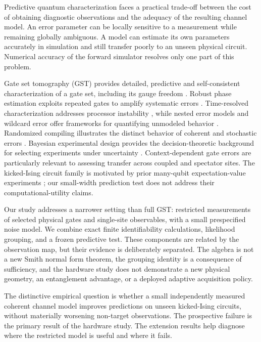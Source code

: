 \documentclass[11pt,a4paper]{article}
\begin{document}
Predictive quantum characterization faces a practical trade-off between the cost of obtaining diagnostic observations and the adequacy of the resulting channel model. An error parameter can be locally sensitive to a measurement while remaining globally ambiguous. A model can estimate its own parameters accurately in simulation and still transfer poorly to an unseen physical circuit. Numerical accuracy of the forward simulator resolves only one part of this problem.

Gate set tomography (GST) provides detailed, predictive and self-consistent characterization of a gate set, including its gauge freedom \cite{ref1,ref2}. Robust phase estimation exploits repeated gates to amplify systematic errors \cite{ref3}. Time-resolved characterization addresses processor instability \cite{ref4}, while nested error models and wildcard error offer frameworks for quantifying unmodeled behavior \cite{ref5}. Randomized compiling illustrates the distinct behavior of coherent and stochastic errors \cite{ref6}. Bayesian experimental design provides the decision-theoretic background for selecting experiments under uncertainty \cite{ref7,ref8}. Context-dependent gate errors \cite{ref10} are particularly relevant to assessing transfer across coupled and spectator sites. The kicked-Ising circuit family is motivated by prior many-qubit expectation-value experiments \cite{ref11}; our small-width prediction test does not address their computational-utility claims.

Our study addresses a narrower setting than full GST: restricted measurements of selected physical gates and single-site observables, with a small prespecified noise model. We combine exact finite identifiability calculations, likelihood grouping, and a frozen predictive test. These components are related by the observation map, but their evidence is deliberately separated. The algebra is not a new Smith normal form theorem, the grouping identity is a consequence of sufficiency, and the hardware study does not demonstrate a new physical geometry, an entanglement advantage, or a deployed adaptive acquisition policy.

The distinctive empirical question is whether a small independently measured coherent channel model improves predictions on unseen kicked-Ising circuits, without materially worsening non-target observations. The prospective failure is the primary result of the hardware study. The extension results help diagnose where the restricted model is useful and where it fails.
\end{document}
